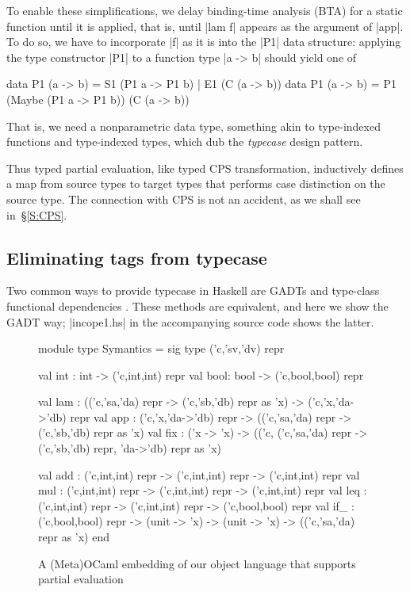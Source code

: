 To enable these simplifications, we delay binding-time analysis (BTA)
for a static function until it is applied, that is, until |lam f|
appears as the argument of |app|.  To do so, we have to incorporate |f|
as it is into the |P1| data structure: applying the type constructor
|P1| to a function type |a -> b| should yield one of
\begin{code}
data P1 (a -> b) = S1 (P1 a -> P1 b) | E1 (C (a -> b))
data P1 (a -> b) = P1 (Maybe (P1 a -> P1 b)) (C (a -> b))
\end{code}
That is, we need a nonparametric data type, something akin to
type-indexed functions and type-indexed types, which
\citet{oliveira-typecase} dub the \emph{typecase} design pattern.

Thus typed partial evaluation, like typed CPS transformation,
inductively defines a map from source types to target types that
performs case distinction on the source type.  The connection with CPS
is not an accident, as we shall see in~\S\ref{S:CPS}.

\subsection{Eliminating tags from typecase}
\label{S:PE-GADT}

Two common ways to provide typecase in Haskell are
GADTs and type-class functional dependencies
\cite{oliveira-typecase}.  These
methods are equivalent, and here we show the GADT way; |incope1.hs|
in the accompanying source code shows the latter.

\begin{figure*}
\begin{floatrule}
\begin{code}
module type Symantics = sig
  type ('c,'sv,'dv) repr

  val int : int  -> ('c,int,int) repr
  val bool: bool -> ('c,bool,bool) repr

  val lam : (('c,'sa,'da) repr -> ('c,'sb,'db) repr as 'x) -> ('c,'x,'da->'db) repr
  val app : ('c,'x,'da->'db) repr -> (('c,'sa,'da) repr -> ('c,'sb,'db) repr as 'x)
  val fix : ('x -> 'x) -> (('c, ('c,'sa,'da) repr -> ('c,'sb,'db) repr, 'da->'db) repr as 'x)

  val add : ('c,int,int) repr -> ('c,int,int) repr -> ('c,int,int) repr
  val mul : ('c,int,int) repr -> ('c,int,int) repr -> ('c,int,int) repr
  val leq : ('c,int,int) repr -> ('c,int,int) repr -> ('c,bool,bool) repr
  val if_ : ('c,bool,bool) repr -> (unit -> 'x) -> (unit -> 'x) -> (('c,'sa,'da) repr as 'x)
end
\end{code}
\end{floatrule}
\caption{A (Meta)OCaml embedding of our object language that supports partial evaluation}
\label{fig:ocaml}
\end{figure*}

